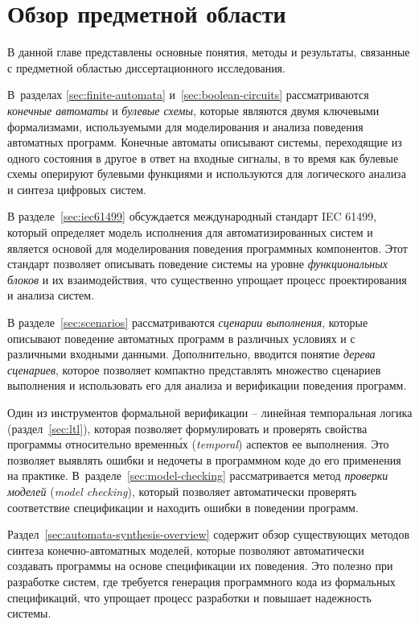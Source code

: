 \chapter{Обзор предметной области}
\label{ch:overview}

В данной главе представлены основные понятия, методы и результаты, связанные с предметной областью диссертационного исследования.

В~разделах \ref{sec:finite-automata} и~\ref{sec:boolean-circuits} рассматриваются \textit{конечные автоматы} и \textit{булевые схемы}, которые являются двумя ключевыми формализмами, используемыми для моделирования и анализа поведения автоматных программ.
Конечные автоматы описывают системы, переходящие из одного состояния в другое в ответ на входные сигналы, в то время как булевые схемы оперируют булевыми функциями и используются для логического анализа и синтеза цифровых систем.

В разделе~\ref{sec:iec61499} обсуждается международный стандарт IEC 61499, который определяет модель исполнения для автоматизированных систем и является основой для моделирования поведения программных компонентов.
Этот стандарт позволяет описывать поведение системы на уровне \textit{функциональных блоков} и их взаимодействия, что существенно упрощает процесс проектирования и анализа систем.

В разделе~\ref{sec:scenarios} рассматриваются \textit{сценарии выполнения}, которые описывают поведение автоматных программ в различных условиях и с различными входными данными.
Дополнительно, вводится понятие \textit{дерева сценариев}, которое позволяет компактно представлять множество сценариев выполнения и использовать его для анализа и верификации поведения программ.

Один из инструментов формальной верификации \--- линейная темпоральная логика (раздел~\ref{sec:ltl}), которая позволяет формулировать и проверять свойства программы относительно временн\'{ы}х (\textit{temporal}) аспектов ее выполнения.
Это позволяет выявлять ошибки и недочеты в программном коде до его применения на практике.
В~разделе~\ref{sec:model-checking} рассматривается метод \textit{проверки моделей} (\textit{model checking}), который позволяет автоматически проверять соответствие спецификации и находить ошибки в поведении программ.

Раздел~\ref{sec:automata-synthesis-overview} содержит обзор существующих методов синтеза конечно-автоматных моделей, которые позволяют автоматически создавать программы на основе спецификации их поведения.
Это полезно при разработке систем, где требуется генерация программного кода из формальных спецификаций, что упрощает процесс разработки и повышает надежность системы.


